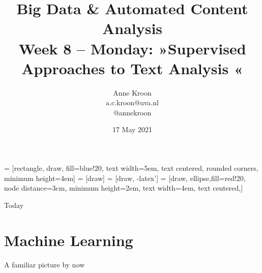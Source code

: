 \documentclass[handout]{beamer}
\title[Big Data and Automated Content Analysis]{\textbf{Big Data \& Automated Content Analysis} \\ Week 8 -- Monday: »Supervised Approaches to Text Analysis «}
\author[Anne Kroon]{Anne Kroon \\ \footnotesize{a.c.kroon@uva.nl \\@annekroon} \\ }
\date{17 May 2021}
\institute[UvA]{Afdeling Communicatiewetenschap \\Universiteit van Amsterdam}
\begin{document}
	

 = [rectangle, draw, fill=blue!20, 
text width=5em, text centered, rounded corners, minimum height=4em]
 = [draw]
 = [draw, -latex']
 = [draw, ellipse,fill=red!20, node distance=3cm,
minimum height=2em, text width=4em, text centered,]

	
	\begin{frame}{}
		\titlepage
	\end{frame}
	
	\begin{frame}{Today}
		\tableofcontents
	\end{frame}
	

\section[Machine Learning]{Machine Learning}


\begin{frame}{A familiar picture by now}

\cite{Boumans2016}
\end{frame}
\end{document}
